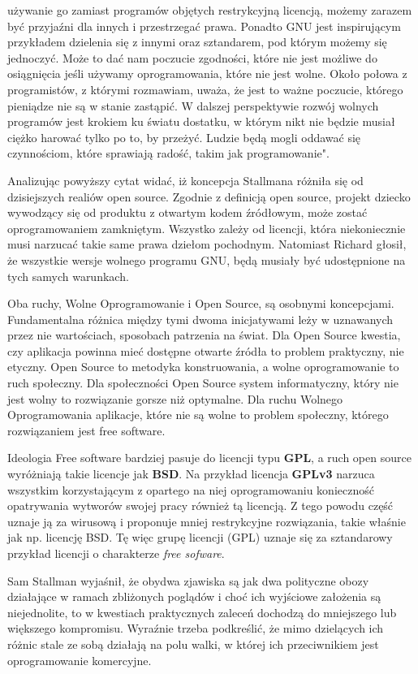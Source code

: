 \documentclass{article}
\begin{document}
używanie go zamiast programów objętych restrykcyjną licencją, możemy zarazem być przyjaźni dla innych i przestrzegać prawa. Ponadto GNU jest inspirującym przykładem dzielenia się z innymi oraz sztandarem, pod którym możemy się jednoczyć. Może to dać nam poczucie zgodności, które nie jest możliwe do osiągnięcia jeśli używamy oprogramowania, które nie jest wolne. Około połowa z programistów, z którymi rozmawiam, uważa, że jest to ważne poczucie, którego pieniądze nie są w stanie zastąpić. W dalszej perspektywie rozwój wolnych programów jest krokiem ku światu dostatku, w którym nikt nie będzie musiał ciężko harować tylko po to, by przeżyć. Ludzie będą mogli oddawać się czynnościom, które sprawiają radość, takim jak programowanie"\cite{gnu.manifest}. 

Analizując powyższy cytat widać, iż koncepcja Stallmana różniła się od dzisiejszych realiów open source. Zgodnie z definicją open source, projekt dziecko wywodzący się od produktu z otwartym kodem źródłowym, może zostać oprogramowaniem zamkniętym. Wszystko zależy od licencji, która niekoniecznie musi narzucać takie same prawa dziełom pochodnym. Natomiast Richard głosił, że wszystkie wersje wolnego programu GNU, będą musiały być udostępnione na tych samych warunkach.

Oba ruchy, Wolne Oprogramowanie i Open Source, są osobnymi koncepcjami. Fundamentalna różnica między tymi dwoma inicjatywami leży w uznawanych przez nie wartościach, sposobach patrzenia na świat. Dla Open Source kwestia, czy aplikacja powinna mieć dostępne otwarte źródła to problem praktyczny, nie etyczny. Open Source to metodyka konstruowania, a wolne oprogramowanie to ruch społeczny. Dla społeczności Open Source system informatyczny, który nie jest wolny to rozwiązanie gorsze niż optymalne. Dla ruchu Wolnego Oprogramowania aplikacje, które nie są wolne to problem społeczny, którego rozwiązaniem jest free software\cite{Kotula}. 

Ideologia Free software bardziej pasuje do licencji typu \textbf{GPL}, a ruch open source wyróżniają takie licencje jak \textbf{BSD}. Na przykład licencja \textbf{GPLv3} narzuca wszystkim korzystającym z opartego na niej oprogramowaniu konieczność opatrywania wytworów swojej pracy również tą licencją. Z tego powodu część uznaje ją za wirusową i proponuje mniej restrykcyjne rozwiązania, takie właśnie jak np. licencję BSD. Tę więc grupę licencji (GPL) uznaje się za sztandarowy przykład licencji o charakterze \emph{free sofware}\cite{Kotula}.

Sam Stallman wyjaśnił, że obydwa zjawiska są jak dwa polityczne obozy działające w ramach zbliżonych poglądów i choć ich wyjściowe założenia są niejednolite, to w kwestiach praktycznych zaleceń dochodzą do mniejszego lub większego kompromisu. Wyraźnie trzeba podkreślić, że mimo dzielących ich różnic stale ze sobą działają na polu walki, w której ich przeciwnikiem jest oprogramowanie komercyjne\cite{Kotula}.
\end{document}
